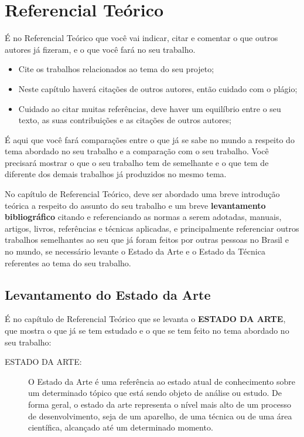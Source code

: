 %
\chapter{Referencial Teórico}

É no Referencial Teórico que você vai indicar, citar e comentar o que outros autores já fizeram, e o que você fará no seu trabalho.

\begin{itemize}
    \item Cite os trabalhos relacionados ao tema do seu projeto; 
    \item Neste capítulo haverá citações de  outros autores, então cuidado com o plágio;
    \item Cuidado ao citar muitas referências, deve haver um equilíbrio entre o seu texto, as suas contribuições e as citações de outros autores;
\end{itemize}

É aqui que você fará comparações entre o que já se sabe no mundo a respeito do tema abordado no seu trabalho e a comparação com o seu trabalho. Você precisará mostrar o que o seu trabalho tem de semelhante e o que tem de diferente dos demais trabalhos já produzidos no mesmo tema.

No capítulo de Referencial Teórico, deve ser abordado uma breve introdução teórica a respeito do assunto do seu trabalho e um breve {\bf levantamento bibliográfico} citando e referenciando as normas a serem adotadas, manuais, artigos, livros, referências e técnicas aplicadas, e principalmente referenciar outros trabalhos semelhantes ao seu que já foram feitos por outras pessoas no Brasil e no mundo, se necessário levante o Estado da Arte e o Estado da Técnica referentes ao tema do seu trabalho. 

\section{Levantamento do Estado da Arte}

É no capítulo de Referencial Teórico que se levanta o \textbf{ESTADO DA ARTE}, que mostra o que já se tem estudado e o que se tem feito no tema abordado no seu trabalho:
    
\begin{description}
    \item [ESTADO DA ARTE:] O Estado da Arte é uma referência ao estado atual de conhecimento sobre um determinado tópico que está sendo objeto de análise ou estudo. De forma geral, o estado da arte representa o nível mais alto de um processo de desenvolvimento, seja de um aparelho, de uma técnica ou de uma área científica, alcançado até um determinado momento. 
\end{description}

